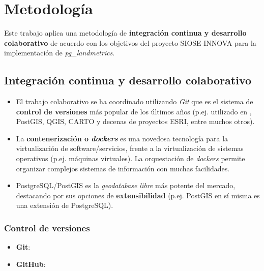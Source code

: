 

\chapter{Metodología}\label{chap:metod}

Este trabajo aplica una metodología de \textbf{integración continua y desarrollo colaborativo} de acuerdo con los objetivos del proyecto SIOSE-INNOVA para la implementación de \textit{pg\_landmetrics}.


\section{Integración continua y desarrollo colaborativo}

\begin{graybox}
\begin{itemize}
\item El trabajo colaborativo se ha coordinado utilizando \textit{Git} que es el sistema de \textbf{control de versiones} más popular de los últimos años (p.ej. utilizado en , PostGIS, QGIS, CARTO y decenas de proyectos ESRI, entre muchos otros).
\item La \textbf{contenerización o \textit{dockers}} es una novedosa tecnología para la virtualización de software/servicios, frente a la virtualización de sistemas operativos (p.ej. máquinas virtuales). La orquestación de \textit{dockers} permite organizar complejos sistemas de información con muchas facilidades.
\item PostgreSQL/PostGIS es la \textit{geodatabase libre} más potente del mercado, destacando por sus opciones de \textbf{extensibilidad} (p.ej. PostGIS en sí misma es una extensión de PostgreSQL).
\end{itemize}
\end{graybox}



\subsection{Control de versiones}



\begin{itemize}
\item\textbf{Git}: 
\item\textbf{GitHub}: 
\end{itemize}




